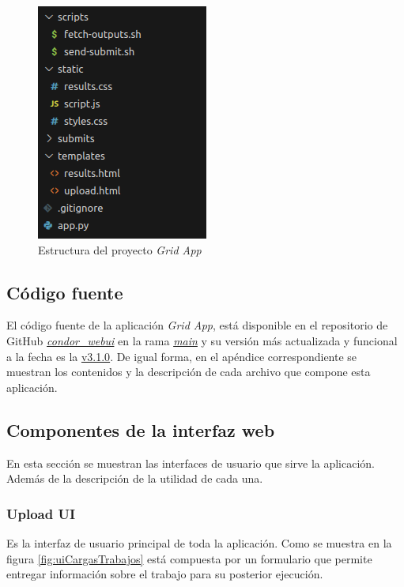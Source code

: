 \begin{figure}[H]
	\centering
	\includegraphics[scale=0.35]{tablas-images/pmv/estructura-proyecto-grid-app.png}
	\caption{Estructura del proyecto \textit{Grid App}}
	\label{fig:estructura-proyecto-grid-app}
\end{figure}

\subsection{Código fuente}
\noindent

El código fuente de la aplicación \textit{Grid App}, está disponible en el repositorio de GitHub \href{https://github.com/JuanEstebanOsma1012/condor\_webui}{\textit{condor\_webui}} en la rama \href{https://github.com/JuanEstebanOsma1012/condor\_webui/tree/main}{\textit{main}} y su versión más actualizada y funcional a la fecha es la \href{https://github.com/JuanEstebanOsma1012/condor\_webui/releases/tag/v3.1.0}{v3.1.0}. De igual forma, en el apéndice correspondiente se muestran los contenidos y la descripción de cada archivo que compone esta aplicación.

\subsection{Componentes de la interfaz web}
\noindent
En esta sección se muestran las interfaces de usuario que sirve la aplicación. Además de la descripción de la utilidad de cada una.

\subsubsection{Upload UI}
\noindent
Es la interfaz de usuario principal de toda la aplicación. Como se muestra en la figura \ref{fig:uiCargasTrabajos} está compuesta por un formulario que permite entregar información sobre el trabajo para su posterior ejecución.

